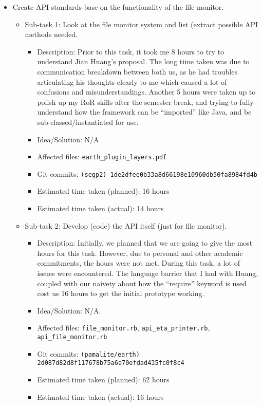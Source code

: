 \documentclass{article}
\begin{document}
\begin{itemize}
	\item Create API standards base on the functionality of the file monitor.
	     \begin{itemize}
	        \item Sub-task 1: Look at the file monitor system and list (extract possible API methods needed.
	           \begin{itemize}
					\item Description: Prior to this task, it took me 8 hours to try to understand Jian Huang's proposal. The long time taken was due to communication breakdown between both us, as he had troubles articulating his thoughts clearly to me which caused a lot of confusions and misunderstandings. Another 5 hours were taken up to polish up my RoR skills after the semester break, and trying to fully understand how the framework can be ``imported'' like Java, and be sub-classed/instantiated for use.
					\item Idea/Solution: N/A
					\item Affected files: \texttt{earth\_plugin\_layers.pdf}
					\item Git commits: \texttt{(segp2) 1de2dfee0b33a8d66198e10960db50fa8984fd4b}
					\item Estimated time taken (planned): 16 hours
					\item Estimated time taken (actual): 14 hours
				\end{itemize}
			\item Sub-task 2: Develop (code) the API itself (just for file monitor).
			   \begin{itemize}
					\item Description: Initially, we planned that we are going to give the most hours for this task. However, due to personal and other academic commitments, the hours were not met. During this task, a lot of issues were encountered. The language barrier that I had with Huang, coupled with our naivety about how the ``require'' keyword is used cost us 16 hours to get the initial prototype working. 
					\item Idea/Solution: N/A. 
					\item Affected files: \texttt{file\_monitor.rb}, \texttt{api\_eta\_printer.rb}, \texttt{api\_file\_monitor.rb}
					\item Git commits: \texttt{(pamalite/earth) 2d087d82d8f117678b75a6a70efdad435fc0f8c4}
					\item Estimated time taken (planned): 62 hours
					\item Estimated time taken (actual): 16 hours

\end{itemize}
\end{itemize}
\end{itemize}
\end{document}
